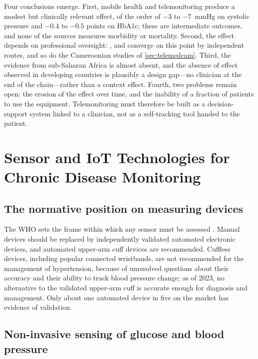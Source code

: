 \documentclass[12pt,a4paper,oneside]{report}
\begin{document}
Four conclusions emerge. First, mobile health and telemonitoring produce a modest but clinically relevant effect, of the order of $-3$ to $-7$~mmHg on systolic pressure and $-0.4$ to $-0.5$ points on HbA1c; these are intermediate outcomes, and none of the sources measures morbidity or mortality. Second, the effect depends on professional oversight: \textcite{mao2020}, \textcite{bandeira2024} and \textcite{mihevc2025} converge on this point by independent routes, and so do the Cameroonian studies of \cref{sec:telemedcam}. Third, the evidence from sub-Saharan Africa is almost absent, and the absence of effect observed in developing countries is plausibly a design gap---no clinician at the end of the chain---rather than a context effect. Fourth, two problems remain open: the erosion of the effect over time, and the inability of a fraction of patients to use the equipment. Telemonitoring must therefore be built as a decision-support system linked to a clinician, not as a self-tracking tool handed to the patient.

\section{Sensor and IoT Technologies for Chronic Disease Monitoring}\label{sec:lr-iot}

\subsection{The normative position on measuring devices}\label{sec:metrology}

The WHO sets the frame within which any sensor must be assessed \parencite{who2023hypertension}. Manual devices should be replaced by independently validated automated electronic devices, and automated upper-arm cuff devices are recommended. Cuffless devices, including popular connected wristbands, are not recommended for the management of hypertension, because of unresolved questions about their accuracy and their ability to track blood pressure change; as of 2023, no alternative to the validated upper-arm cuff is accurate enough for diagnosis and management. Only about one automated device in five on the market has evidence of validation.

\subsection{Non-invasive sensing of glucose and blood pressure}\label{sec:cuffless}
\end{document}
